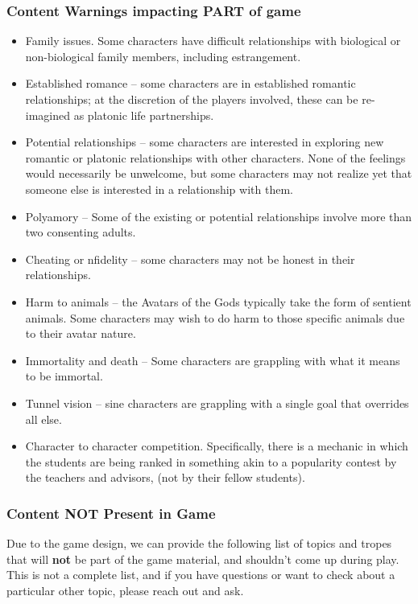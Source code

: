 \documentclass[sheet]{PP}
\begin{document}
\subsubsection{Content Warnings impacting PART of game}
\begin{itemize}
  	\item Family issues. Some characters have difficult relationships with biological or non-biological family members, including estrangement.
	\item Established romance -- some characters are in established romantic relationships; at the discretion of the players involved, these can be re-imagined as platonic life partnerships.
	\item Potential relationships -- some characters are interested in exploring new romantic or platonic relationships with other characters. None of the feelings would necessarily be unwelcome, but some characters may not realize yet that someone else is interested in a relationship with them.
	\item Polyamory -- Some of the existing or potential relationships involve more than two consenting adults.
	\item Cheating or nfidelity -- some characters may not be honest in their relationships.
	\item Harm to animals -- the Avatars of the Gods typically take the form of sentient animals. Some characters may wish to do harm to those specific animals due to their avatar nature.
	\item Immortality and death -- Some characters are grappling with what it means to be immortal.
	\item Tunnel vision -- sine characters are grappling with a single goal that overrides all else.
	\item Character to character competition. Specifically, there is a mechanic in which the students are being ranked in something akin to a popularity contest by the teachers and advisors, (not by their fellow students).

\end{itemize}

\subsubsection{Content NOT Present in Game}
Due to the game design, we can provide the following list of topics and tropes that will \textbf{not} be part of the game material, and shouldn't come up during play. This is not a complete list, and if you have questions or want to check about a particular other topic, please reach out and ask.
\end{document}
